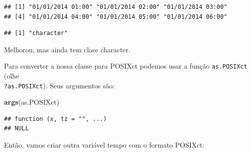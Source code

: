 \documentclass[]{book}
\newenvironment{Shaded}{\begin{snugshade}}{\end{snugshade}}
\newcommand{\KeywordTok}[1]{\textcolor[rgb]{0.13,0.29,0.53}{\textbf{#1}}}
\newcommand{\DataTypeTok}[1]{\textcolor[rgb]{0.13,0.29,0.53}{#1}}
\newcommand{\StringTok}[1]{\textcolor[rgb]{0.31,0.60,0.02}{#1}}
\newcommand{\OperatorTok}[1]{\textcolor[rgb]{0.81,0.36,0.00}{\textbf{#1}}}
\newcommand{\NormalTok}[1]{#1}
\theoremstyle{definition}
\theoremstyle{definition}
\theoremstyle{definition}
\theoremstyle{remark}
\begin{document}
\begin{Shaded}
\end{Shaded}

\begin{verbatim}
## [1] "01/01/2014 01:00" "01/01/2014 02:00" "01/01/2014 03:00"
## [4] "01/01/2014 04:00" "01/01/2014 05:00" "01/01/2014 06:00"
\end{verbatim}

\begin{Shaded}
\end{Shaded}

\begin{verbatim}
## [1] "character"
\end{verbatim}

Melhorou, mas ainda tem clase character.

Para converter a nossa classe para POSIXct podemos usar a função
\texttt{as.POSIXct} (olhe\\
\texttt{?as.POSIXct}). Seus argumentos são:

\begin{Shaded}
\begin{Highlighting}[]
\KeywordTok{args}\NormalTok{(as.POSIXct)}
\end{Highlighting}
\end{Shaded}

\begin{verbatim}
## function (x, tz = "", ...) 
## NULL
\end{verbatim}

Então, vamos criar outra variável tempo com o formato POSIXct:

\begin{Shaded}
\end{Shaded}
\end{document}
